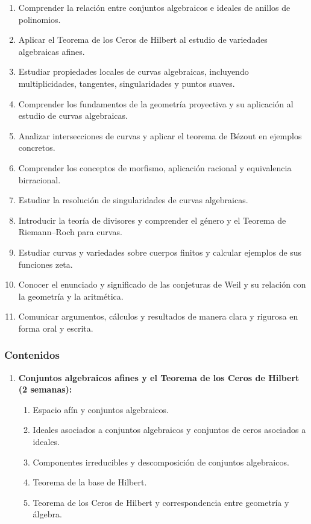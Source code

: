 \begin{refsection}
\begin{enumerate}
\item Comprender la relación entre conjuntos algebraicos e ideales de anillos de polinomios.
\item Aplicar el Teorema de los Ceros de Hilbert al estudio de variedades algebraicas afines.
\item Estudiar propiedades locales de curvas algebraicas, incluyendo multiplicidades, tangentes, singularidades y puntos suaves.
\item Comprender los fundamentos de la geometría proyectiva y su aplicación al estudio de curvas algebraicas.
\item Analizar intersecciones de curvas y aplicar el teorema de Bézout en ejemplos concretos.
\item Comprender los conceptos de morfismo, aplicación racional y equivalencia birracional.
\item Estudiar la resolución de singularidades de curvas algebraicas.
\item Introducir la teoría de divisores y comprender el género y el Teorema de Riemann--Roch para curvas.
\item Estudiar curvas y variedades sobre cuerpos finitos y calcular ejemplos de sus funciones zeta.
\item Conocer el enunciado y significado de las conjeturas de Weil y su relación con la geometría y la aritmética.
\item Comunicar argumentos, cálculos y resultados de manera clara y rigurosa en forma oral y escrita.
\end{enumerate}

\subsubsection*{Contenidos}

\begin{enumerate}

\item \textbf{Conjuntos algebraicos afines y el Teorema de los Ceros de Hilbert (2 semanas):}
\begin{enumerate}
\item Espacio afín y conjuntos algebraicos.
\item Ideales asociados a conjuntos algebraicos y conjuntos de ceros asociados a ideales.
\item Componentes irreducibles y descomposición de conjuntos algebraicos.
\item Teorema de la base de Hilbert.
\item Teorema de los Ceros de Hilbert y correspondencia entre geometría y álgebra.
\end{enumerate}


\end{enumerate}
\end{refsection}
